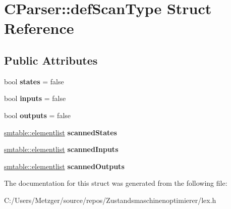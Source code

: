 \hypertarget{struct_c_parser_1_1def_scan_type}{}\section{C\+Parser\+:\+:def\+Scan\+Type Struct Reference}
\label{struct_c_parser_1_1def_scan_type}
\subsection*{Public Attributes}
\begin{DoxyCompactItemize}
\item 
\mbox{\label{struct_c_parser_1_1def_scan_type_a5ef404f5728a4f4c7273b53458031fce}} 
bool {\bfseries states} = false
\item 
\mbox{\label{struct_c_parser_1_1def_scan_type_a24df85b06d551245612b9863151a209c}} 
bool {\bfseries inputs} = false
\item 
\mbox{\label{struct_c_parser_1_1def_scan_type_a8e9ab383e6febb9140fd5aae1e40d96a}} 
bool {\bfseries outputs} = false
\item 
\mbox{\label{struct_c_parser_1_1def_scan_type_aacf09550b0d1279b02b73194d22275d1}} 
\mbox{\hyperlink{classsmtable_a5eb5f5f14b1e52a2bde73255ea71927f}{smtable\+::elementlist}} {\bfseries scanned\+States}
\item 
\mbox{\label{struct_c_parser_1_1def_scan_type_aaad6797130a603091c379db7e47e616d}} 
\mbox{\hyperlink{classsmtable_a5eb5f5f14b1e52a2bde73255ea71927f}{smtable\+::elementlist}} {\bfseries scanned\+Inputs}
\item 
\mbox{\label{struct_c_parser_1_1def_scan_type_a94fabbf316b49aeb05443759943ad994}} 
\mbox{\hyperlink{classsmtable_a5eb5f5f14b1e52a2bde73255ea71927f}{smtable\+::elementlist}} {\bfseries scanned\+Outputs}
\end{DoxyCompactItemize}


The documentation for this struct was generated from the following file\+:\begin{DoxyCompactItemize}
\item 
C\+:/\+Users/\+Metzger/source/repos/\+Zustandsmaschinenoptimierer/lex.\+h\end{DoxyCompactItemize}
